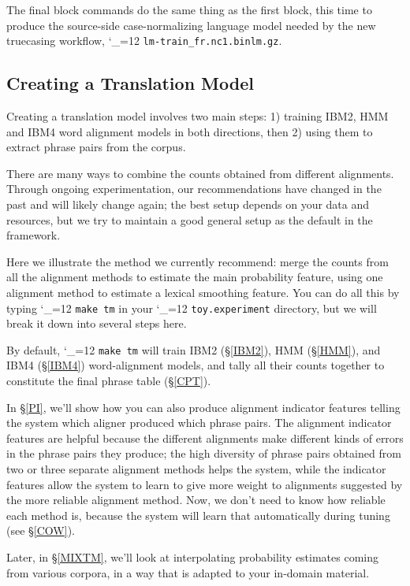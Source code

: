 \documentclass[11pt,letterpaper]{article}
\def\code{\begingroup\catcode`\_=12 \codex}
\newcommand{\codex}[1]{\texttt{#1}\endgroup}
\begin{document}
The final block commands do the same thing as the first block, this time to
produce the source-side case-normalizing language model needed by the new
truecasing workflow, \code{lm-train_fr.nc1.binlm.gz}.

\subsection{Creating a Translation Model} \label{TM}

Creating a translation model involves two main steps: 1) training IBM2, HMM and
IBM4 word alignment models in both directions, then 2) using them to
extract phrase pairs from the corpus.

There are many ways to combine the counts obtained from different alignments.
Through ongoing experimentation, our recommendations have changed in the past
and will likely change again; the best setup depends on your data and
resources, but we try to maintain a good general setup as the default in the
framework.

Here we illustrate the method we currently recommend: merge the counts from all
the alignment methods to estimate the main probability feature, using one
alignment method to estimate a lexical smoothing feature.
You can do all this by typing \code{make tm} in your \code{toy.experiment}
directory, but we will break it down into several steps here.

By default, \code{make tm} will train IBM2 (\S\ref{IBM2}), HMM (\S\ref{HMM}),
and IBM4 (\S\ref{IBM4}) word-alignment models, and tally all their counts
together to constitute the final phrase table (\S\ref{CPT}).

In \S\ref{PI}, we'll show how you can also produce alignment indicator features
telling the system which aligner produced which phrase pairs.  The alignment
indicator features are helpful because the different alignments make different
kinds of errors in the phrase pairs they produce; the high diversity of phrase
pairs obtained from two or three separate alignment methods helps the system,
while the indicator features allow the system to learn to give more weight to
alignments suggested by the more reliable alignment method.  Now, we don't need
to know how reliable each method is, because the system will learn that
automatically during tuning (see \S\ref{COW}).

Later, in \S\ref{MIXTM}, we'll look at interpolating probability estimates
coming from various corpora, in a way that is adapted to your in-domain
material.
\end{document}
